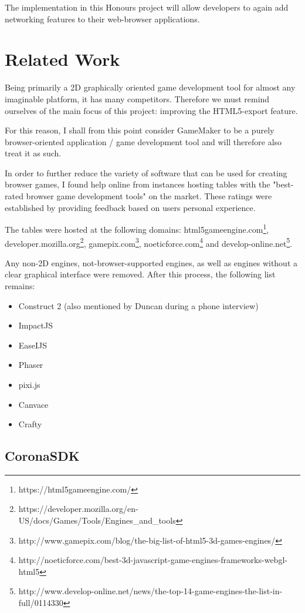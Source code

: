 \documentclass[bsc,frontabs,twoside,singlespacing,parskip,deptreport]{infthesis}     %
\begin{document}
The implementation in this Honours project will allow developers to again add networking features to their web-browser applications.

\section{Related Work}
Being primarily a 2D graphically oriented game development tool for almost any imaginable platform, it has many competitors. Therefore we must remind ourselves of the main focus of this project: improving the HTML5-export feature. 

For this reason, I shall from this point consider GameMaker to be a purely browser-oriented application / game development tool and will therefore also treat it as such.

In order to further reduce the variety of software that can be used for creating browser games, I found help online from instances hosting tables with the "best-rated browser game development tools" on the market. These ratings were established by providing feedback based on users personal experience.

The tables were hosted at the following domains:
html5gameengine.com\footnote{https://html5gameengine.com/}, 
developer.mozilla.org\footnote{https://developer.mozilla.org/en-US/docs/Games/Tools/Engines\_and\_tools}, 
gamepix.com\footnote{http://www.gamepix.com/blog/the-big-list-of-html5-3d-games-engines/}, 
noeticforce.com\footnote{http://noeticforce.com/best-3d-javascript-game-engines-frameworks-webgl-html5} and 
develop-online.net\footnote{http://www.develop-online.net/news/the-top-14-game-engines-the-list-in-full/0114330}.

Any non-2D engines, not-browser-supported engines, as well as engines without a clear graphical interface were removed. After this process, the following list remains:
\begin{itemize}
\item Construct 2 (also mentioned by Duncan during a phone interview\cite{Gamemaker_DnD})
\item ImpactJS
\item EaseIJS
\item Phaser
\item pixi.js
\item Canvace
\item Crafty
\end{itemize}

\subsection{CoronaSDK}
\end{document}
